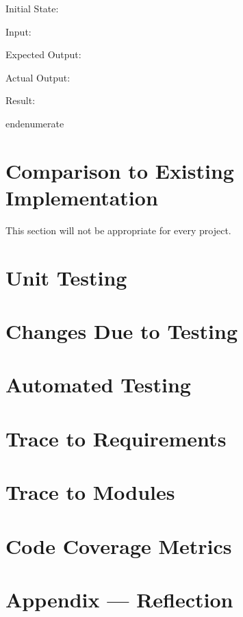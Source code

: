 \documentclass[12pt, titlepage]{article}
\begin{document}
\begin{enumerate}
\begin{enumerate}
\begin{enumerate}
\begin{enumerate}
\begin{enumerate}
\begin{enumerate}
\begin{enumerate}
\begin{enumerate}
\begin{enumerate}
  Initial State:

  Input:

  Expected Output:

  Actual Output:

  Result:

end{enumerate}


\section{Comparison to Existing Implementation}	

This section will not be appropriate for every project.

\section{Unit Testing}

\section{Changes Due to Testing}


\section{Automated Testing}
		
\section{Trace to Requirements}
		
\section{Trace to Modules}		

\section{Code Coverage Metrics}




\newpage{}
\section*{Appendix --- Reflection}


\end{enumerate}
\end{enumerate}
\end{enumerate}
\end{enumerate}
\end{enumerate}
\end{enumerate}
\end{enumerate}
\end{enumerate}
\end{enumerate}
\end{document}
